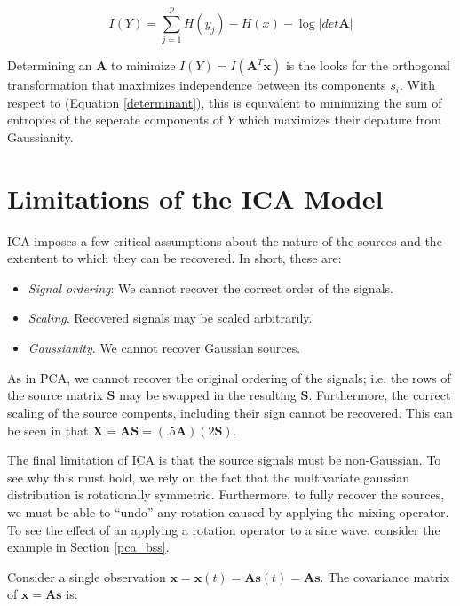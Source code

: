 \documentclass[11pt, oneside, a4paper]{report}
\begin{document}
\begin{equation}\label{determinant}
I(Y) = \sum_{j=1}^{p} H(y_{j}) - H(x) - \log | det \mathbf A |
\end{equation}

Determining an $\mathbf A$ to minimize $I(Y) = I(\mathbf A^T \mathbf x)$ is the looks for the orthogonal 
transformation that maximizes independence between its components $s_i$. With respect to 
(Equation \ref{determinant}), this is equivalent to minimizing the sum of entropies of the seperate 
components of $Y$ which maximizes their depature from Gaussianity.




\section{Limitations of the ICA Model}\label{ICA_restrictions}

ICA imposes a few critical assumptions about the nature of the sources
and the extentent to which they can be recovered. In short, these are:


\begin{itemize}
  \item \emph{Signal ordering}: We cannot recover the correct order of
    the signals.
  \item \emph{Scaling}. Recovered signals may be scaled arbitrarily.
  \item \emph{Gaussianity}. We cannot recover Gaussian sources.
\end{itemize}


As in PCA, we cannot
recover the original ordering of the signals; i.e. the rows of the
source matrix $\boldsymbol{S}$ may be swapped in the resulting
$\hat{\boldsymbol{S}}$. Furthermore, the correct scaling of the source
compents, including their sign cannot be recovered. This can be seen
in that $\boldsymbol{X} = \boldsymbol{A}\boldsymbol{S} = (.5
\boldsymbol{A})(2 \boldsymbol{S})$.

The final limitation of ICA is that the source signals must be
non-Gaussian. To see why this must hold, we rely on the fact that the
multivariate gaussian distribution is rotationally symmetric. Furthermore,
to fully recover the sources, we must be able to ``undo'' any rotation
caused by applying the mixing operator. To see the effect of an
applying a rotation operator to a sine wave, consider the example in
Section \ref{pca_bss}.

Consider a single observation
$\boldsymbol{x} = \boldsymbol{x}(t) =\boldsymbol{A}\boldsymbol{s}(t) =
\boldsymbol{A}\boldsymbol{s}$. The covariance matrix of
$\boldsymbol{x} = \boldsymbol{A}\boldsymbol{s}$ is:
\end{document}
